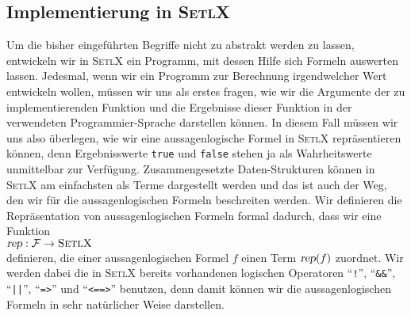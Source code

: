 \subsection{Implementierung in \textsc{SetlX}} 
Um die bisher eingef\"{u}hrten Begriffe nicht zu abstrakt werden zu lassen,
entwickeln wir in \textsc{SetlX} ein Programm, mit dessen Hilfe sich Formeln
auswerten lassen.  
Jedesmal, wenn wir ein Programm zur Berechnung irgendwelcher Wert entwickeln wollen,
m\"{u}ssen wir uns als erstes fragen, wie wir die Argumente der zu implementierenden Funktion und die
Ergebnisse dieser Funktion in der verwendeten Programmier-Sprache darstellen k\"{o}nnen.
In diesem Fall m\"{u}ssen wir uns also \"{u}berlegen, wie wir eine
aussagenlogische Formel in \textsc{SetlX} repr\"{a}sentieren k\"{o}nnen, denn Ergebnisswerte
\texttt{true} und \texttt{false} stehen ja als Wahrheitswerte unmittelbar zur Verf\"{u}gung.
Zusammengesetzte Daten-Strukturen k\"{o}nnen in \textsc{SetlX} am einfachsten als
Terme dargestellt werden und das ist auch der Weg, den wir f\"{u}r die aussagenlogischen
Formeln  beschreiten werden.  Wir definieren die Repr\"{a}sentation von
aussagenlogischen Formeln formal dadurch, dass wir eine Funktion
\\[0.2cm]
\hspace*{1.3cm}
$\textsl{rep}: \mathcal{F} \rightarrow \textsc{SetlX}$
\\[0.2cm]
definieren, die einer aussagenlogischen Formel $f$ einen Term $\textsl{rep}(f)$ zuordnet.  Wir
werden dabei die in \textsc{SetlX} bereits vorhandenen logischen Operatoren
``\texttt{!}'', ``\texttt{\&\&}'', ``\texttt{||}'', ``\texttt{=>}'' und
``\texttt{<==>}'' benutzen, denn damit k\"{o}nnen wir die aussagenlogischen Formeln in sehr nat\"{u}rlicher
Weise darstellen.
